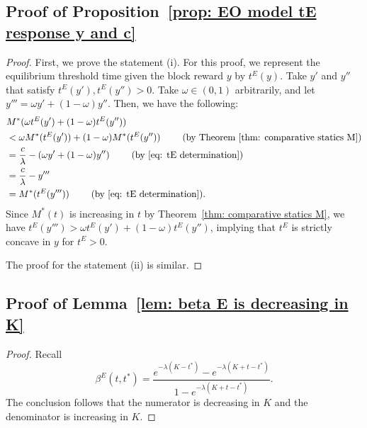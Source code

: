 \documentclass[12pt, letterpaper]{article}
\begin{document}
\subsection{Proof of Proposition~\ref{prop: EO model tE response y and c}}
\begin{proof} %
    First, we prove the statement (i). For this proof, we represent the equilibrium threshold time given the block reward $y$ by $t^E(y)$. Take $y'$ and $y''$ that satisfy $t^E(y'), t^E(y'') > 0$. Take $\omega \in (0,1)$ arbitrarily, and let $y''' = \omega y' + (1-\omega) y''$. Then, we have the following:
    \begin{align}
        & M^*(\omega t^E(y') + (1 - \omega) t^E(y'')) \\
        & < \omega M^*(t^E(y')) + (1 - \omega) M^*(t^E(y'')) \quad\quad\text{ (by Theorem~\ref{thm: comparative statics M})}\\
        & = \frac{c}{\lambda} - (\omega y' + (1-\omega) y'')
        \quad\quad\text{ (by \eqref{eq: tE determination})}  
        \\
        & = \frac{c}{\lambda} - y'''\\
        &= M^*(t^E(y''')) \quad\quad\text{ (by \eqref{eq: tE determination})} .
    \end{align}
    Since $M^*(t)$ is increasing in $t$ by Theorem~\ref{thm: comparative statics M}, we have $t^E(y''') > \omega t^E(y') + (1 - \omega) t^E(y'')$, implying that $t^E$ is strictly concave in $y$ for $t^E > 0$. 

    The proof for the statement (ii) is similar.
\end{proof} %

\subsection{Proof of Lemma~\ref{lem: beta E is decreasing in K}} \label{subsec: beta E is decreasing in K}

\begin{proof} %
Recall 
\begin{equation}
    \beta^E(t, t^*) = \frac{e^{- \lambda (K - t^*)} - e^{- \lambda (K + t - t^*)}}{1 - e^{- \lambda (K + t - t^*)}}.
\end{equation}
The conclusion follows that the numerator is decreasing in $K$ and the denominator is increasing in $K$.
\end{proof} %
\end{document}

